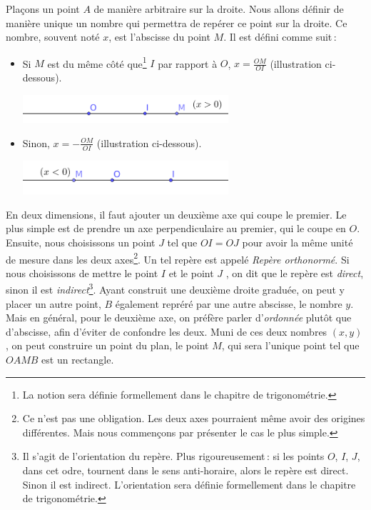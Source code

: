 		Plaçons un point $A$ de manière arbitraire sur la droite. Nous allons définir de manière unique un nombre qui permettra de repérer ce point sur la droite. Ce nombre, souvent noté $x$, est l'abscisse du point $M$. Il est défini comme suit\,:
		\begin{itemize}[$\bullet$]
			\item Si $M$ est du même côté que\footnote{La notion  sera définie formellement dans le chapitre de trigonométrie.} $I$ par rapport à $O$, $x=\frac{OM}{OI}$ (illustration ci-dessous).

			\includegraphics[width=0.6\textwidth]{image/calcul/point1d1.png}
			\item Sinon, $x=-\frac{OM}{OI}$ (illustration ci-dessous). 

			\includegraphics[width=0.6\textwidth]{image/calcul/point1d2.png}
		\end{itemize}



		En deux dimensions, il faut ajouter un deuxième axe qui coupe le premier. Le plus simple est de prendre un axe perpendiculaire au premier, qui le coupe en $O$. Ensuite, nous choisissons un point $J$ tel que $OI=OJ$ pour avoir la même unité de mesure dans les deux axes\footnote{Ce n'est pas une obligation. Les deux axes pourraient même avoir des origines différentes. Mais nous commençons par présenter le cas le plus simple.}. Un tel repère est appelé \emph{Repère orthonormé}. Si nous choisissons de mettre le point $I$  et le point $J$ , on dit que le repère est \emph{direct}, sinon il est \emph{indirect}\footnote{Il s'agit de l'orientation du repère. Plus rigoureusement\,: si les points $O$, $I$, $J$, dans cet odre, tournent dans le sens anti-horaire, alors le repère est direct. Sinon il est indirect. L'orientation sera définie formellement dans le chapitre de trigonométrie.}. Ayant construit une deuxième droite graduée, on peut y placer un autre point, $B$ également repréré par une autre abscisse, le nombre $y$. Mais en général, pour le deuxième axe, on préfère parler d'\emph{ordonnée} plutôt que d'abscisse, afin d'éviter de confondre les deux. 
		Muni de ces deux nombres $(x,y)$, on peut construire un point du plan, le point $M$, qui sera l'unique point tel que $OAMB$ est un rectangle. 

